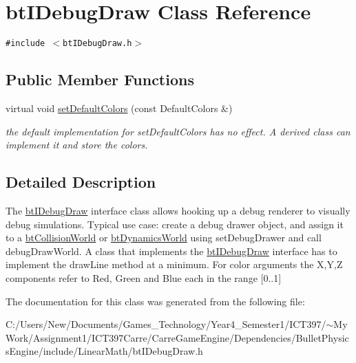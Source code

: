 \hypertarget{classbt_i_debug_draw}{
\section{btIDebugDraw Class Reference}
\label{classbt_i_debug_draw}
}
{\tt \#include $<$btIDebugDraw.h$>$}

\subsection*{Public Member Functions}
\begin{CompactItemize}
\item 
\hypertarget{classbt_i_debug_draw_ec5aa09aa69cc324c98788a979b094ce}{
virtual void \hyperlink{classbt_i_debug_draw_ec5aa09aa69cc324c98788a979b094ce}{setDefaultColors} (const DefaultColors \&)}
\label{classbt_i_debug_draw_ec5aa09aa69cc324c98788a979b094ce}

\begin{CompactList}\small\item\em the default implementation for setDefaultColors has no effect. A derived class can implement it and store the colors. \item\end{CompactList}\end{CompactItemize}


\subsection{Detailed Description}
The \hyperlink{classbt_i_debug_draw}{btIDebugDraw} interface class allows hooking up a debug renderer to visually debug simulations. Typical use case: create a debug drawer object, and assign it to a \hyperlink{classbt_collision_world}{btCollisionWorld} or \hyperlink{classbt_dynamics_world}{btDynamicsWorld} using setDebugDrawer and call debugDrawWorld. A class that implements the \hyperlink{classbt_i_debug_draw}{btIDebugDraw} interface has to implement the drawLine method at a minimum. For color arguments the X,Y,Z components refer to Red, Green and Blue each in the range \mbox{[}0..1\mbox{]} 

The documentation for this class was generated from the following file:\begin{CompactItemize}
\item 
C:/Users/New/Documents/Games\_\-Technology/Year4\_\-Semester1/ICT397/$\sim$My Work/Assignment1/ICT397Carre/CarreGameEngine/Dependencies/BulletPhysicsEngine/include/LinearMath/btIDebugDraw.h\end{CompactItemize}
